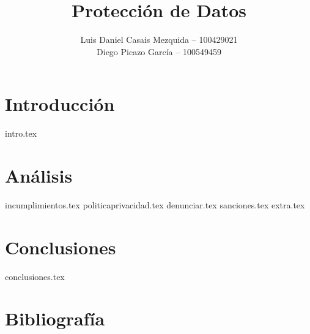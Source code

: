 \documentclass[es]{uc3mreport}
\author{
    Luis Daniel Casais Mezquida -- 100429021\\
    Diego Picazo García -- 100549459
}
\title{Protección de Datos}
\begin{document}
    \makecover

    \tableofcontents

    \begin{report}

        \part{Introducción}
        {intro.tex}

        \part{Análisis}
        {incumplimientos.tex}
        {politicaprivacidad.tex}
        {denunciar.tex}
        {sanciones.tex}
        {extra.tex}

        \part{Conclusiones}
        {conclusiones.tex}

    \end{report}

    \label{bibliography}
    \part{Bibliografía}
    \printbibliography
\end{document}
